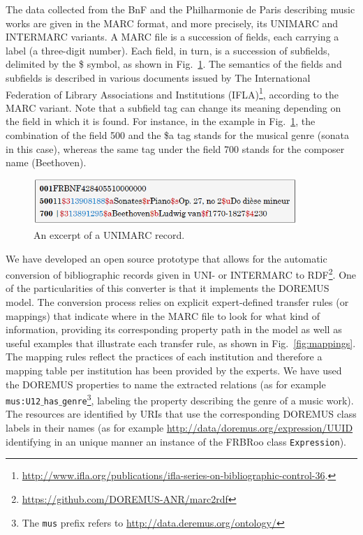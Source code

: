 \documentclass[runningheads,a4paper]{llncs}
\begin{document}
The data collected from the BnF and the Philharmonie de Paris describing music works are given in the MARC format, and more precisely, its UNIMARC and INTERMARC variants. A MARC file is a succession of fields, each carrying a label (a three-digit number). Each field, in turn, is a succession of subfields, delimited by the \$ symbol, as shown in Fig.~\ref{fig:unimarc}. The semantics of the fields and subfields is described in various documents issued by The International Federation of Library Associations and Institutions (IFLA)\footnote{\url{http://www.ifla.org/publications/ifla-series-on-bibliographic-control-36}.}, according to the MARC variant. Note that a subfield tag can change its meaning depending on the field in which it is found. For instance, in the example in Fig.~\ref{fig:unimarc}, the combination of the field 500 and the \$a tag stands for the musical genre (sonata in this case), whereas the same tag under the field 700 stands for the composer name (Beethoven).

\begin{figure}
  \centering
  \includegraphics[width=10cm]{img/marc-exmpl-simple.png}
  \caption{An excerpt of a UNIMARC record.}
  \label{fig:unimarc}
\end{figure}

We have developed an open source prototype that allows for the automatic conversion of bibliographic records given in UNI- or INTERMARC to RDF\footnote{\url{https://github.com/DOREMUS-ANR/marc2rdf}}. One of the particularities of this converter is that it implements the DOREMUS model. The conversion process relies on explicit expert-defined transfer rules (or mappings) that indicate where in the MARC file to look for what kind of information, providing its corresponding property path in the model as well as useful examples that illustrate each transfer rule, as shown in Fig.~\ref{fig:mappings}. The mapping rules reflect the practices of each institution and therefore a mapping table per institution has been provided by the experts. We have used the DOREMUS properties to name the extracted relations (as for example \texttt{mus:U12$\_$has$\_$genre}\footnote{The \texttt{mus} prefix refers to \url{http://data.deremus.org/ontology/}}, labeling the property describing the genre of a music work). The resources are identified by URIs that use the corresponding DOREMUS class labels in their names (as for example \url{http://data/doremus.org/expression/UUID} identifying in an unique manner an instance of the FRBRoo class \texttt{Expression}).
\end{document}
